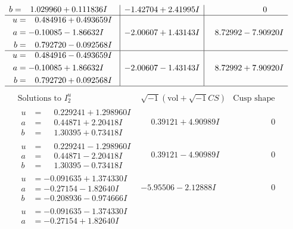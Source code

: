 \documentclass[1p]{elsarticle_modified}
\theoremstyle{definition}
\newcommand{\I}{\sqrt{-1}}
\begin{document}
$$\begin{array}{c|c|c}
\begin{aligned}
b &= \phantom{-}1.029960 + 0.111836 I\end{aligned}
 & -1.42704 + 2.41995 I & \phantom{-0.000000 } 0 \\ \hline\begin{aligned}
u &= \phantom{-}0.484916 + 0.493659 I \\
a &= -0.10085 - 1.86632 I \\
b &= \phantom{-}0.792720 - 0.092568 I\end{aligned}
 & -2.00607 + 1.43143 I & \phantom{-}8.72992 - 7.90920 I \\ \hline\begin{aligned}
u &= \phantom{-}0.484916 - 0.493659 I \\
a &= -0.10085 + 1.86632 I \\
b &= \phantom{-}0.792720 + 0.092568 I\end{aligned}
 & -2.00607 - 1.43143 I & \phantom{-}8.72992 + 7.90920 I\\
 \hline 
 \end{array}$$\newpage$$\begin{array}{c|c|c}  
\text{Solutions to }I^u_{2}& \I (\text{vol} + \sqrt{-1}CS) & \text{Cusp shape}\\
 \hline 
\begin{aligned}
u &= \phantom{-}0.229241 + 1.298960 I \\
a &= \phantom{-}0.44871 + 2.20418 I \\
b &= \phantom{-}1.30395 + 0.73418 I\end{aligned}
 & \phantom{-}0.39121 + 4.90989 I & \phantom{-0.000000 } 0 \\ \hline\begin{aligned}
u &= \phantom{-}0.229241 - 1.298960 I \\
a &= \phantom{-}0.44871 - 2.20418 I \\
b &= \phantom{-}1.30395 - 0.73418 I\end{aligned}
 & \phantom{-}0.39121 - 4.90989 I & \phantom{-0.000000 } 0 \\ \hline\begin{aligned}
u &= -0.091635 + 1.374330 I \\
a &= -0.27154 - 1.82640 I \\
b &= -0.208936 - 0.974666 I\end{aligned}
 & -5.95506 - 2.12888 I & \phantom{-0.000000 } 0 \\ \hline\begin{aligned}
u &= -0.091635 - 1.374330 I \\
a &= -0.27154 + 1.82640 I \\

\end{aligned}
\end{array}$$
\end{document}
